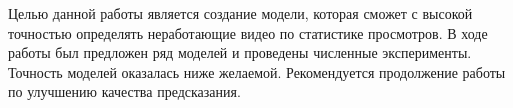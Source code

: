 
Целью данной работы является создание модели, которая сможет с высокой точностью определять неработающие видео по статистике просмотров. В ходе работы был предложен ряд моделей и проведены численные эксперименты. Точность моделей оказалась ниже желаемой. Рекомендуется продолжение работы по улучшению качества предсказания.